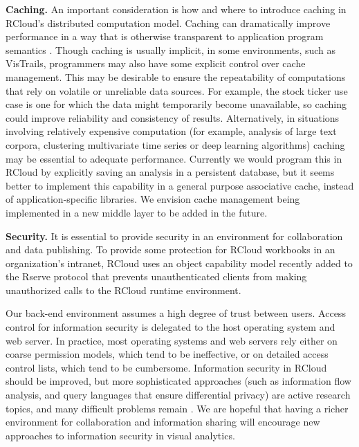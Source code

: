 {\bf Caching.}
An important consideration is how and where to introduce caching
in RCloud's distributed computation model. Caching can dramatically
improve performance in a way that is otherwise transparent to
application program semantics \cite{Callahan:2006:VVM, Guo:2010:TPI}.
Though caching is usually implicit, in some environments, such as
VisTrails, programmers may also have some explicit control over cache
management. This may be desirable to ensure the repeatability of
computations that rely on volatile or unreliable data sources.
For example, the stock ticker use case is one for which the data
might temporarily become unavailable, so caching could improve
reliability and consistency of results. Alternatively, in situations
involving relatively expensive computation (for example, analysis of large
text corpora, clustering multivariate time series or deep learning algorithms)
caching may be essential to adequate performance. Currently we would
program this in RCloud by explicitly saving an analysis in a persistent database,
but it seems better to implement this capability in a general purpose associative
cache, instead of application-specific libraries. We envision cache management
being implemented in a new middle layer to be added in the future.

{\bf Security.}
It is essential to provide security in an environment for
collaboration and data publishing. To provide some
protection for RCloud workbooks in an organization's intranet,
RCloud uses an object capability model
\cite{Miller:2006:RCT}
recently added to the Rserve protocol \cite{Urbanek:2003:AFW}
that prevents unauthenticated clients from making
unauthorized calls to the RCloud runtime environment.

Our back-end environment assumes a high degree of trust between users.
Access control for information security is delegated to the host
operating system and web server. In practice, most operating
systems and web servers rely either on coarse permission models,
which tend to be ineffective, or on detailed access control
lists, which tend to be cumbersome. 
Information security in RCloud should be improved, but more
sophisticated approaches (such as information flow analysis,
and query languages that ensure differential privacy) are
active research topics, and many difficult problems remain
\cite{Moore:2011:SAF}. We are hopeful that having a richer
environment for collaboration and information sharing will encourage
new approaches to information security in visual analytics.
